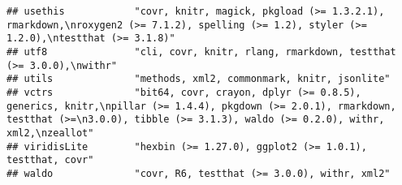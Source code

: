 \documentclass[
]{article}
\begin{document}
\begin{verbatim}
## usethis            "covr, knitr, magick, pkgload (>= 1.3.2.1), rmarkdown,\nroxygen2 (>= 7.1.2), spelling (>= 1.2), styler (>= 1.2.0),\ntestthat (>= 3.1.8)"                                                                                                                                                                                                                                                                                                                                          
## utf8               "cli, covr, knitr, rlang, rmarkdown, testthat (>= 3.0.0),\nwithr"                                                                                                                                                                                                                                                                                                                                                                                                                 
## utils              "methods, xml2, commonmark, knitr, jsonlite"                                                                                                                                                                                                                                                                                                                                                                                                                                      
## vctrs              "bit64, covr, crayon, dplyr (>= 0.8.5), generics, knitr,\npillar (>= 1.4.4), pkgdown (>= 2.0.1), rmarkdown, testthat (>=\n3.0.0), tibble (>= 3.1.3), waldo (>= 0.2.0), withr, xml2,\nzeallot"                                                                                                                                                                                                                                                                                     
## viridisLite        "hexbin (>= 1.27.0), ggplot2 (>= 1.0.1), testthat, covr"                                                                                                                                                                                                                                                                                                                                                                                                                          
## waldo              "covr, R6, testthat (>= 3.0.0), withr, xml2"                                                                                                                                                                                                                                                                                                                                                                                                                                      

\end{verbatim}
\end{document}
